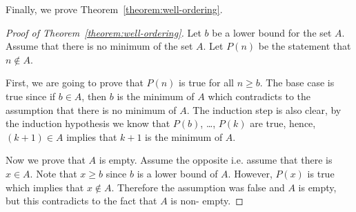 Finally, we prove Theorem~\ref{theorem:well-ordering}.
\begin{proof}[Proof of Theorem~\ref{theorem:well-ordering}]
  Let $b$ be a lower bound for the set $A$. Assume that there is no minimum of
  the set $A$. Let $P(n)$ be the statement that
  $n \notin A$.

  First, we are going to prove that $P(n)$ is true for all
  $n \ge b$. The base case is true since if $b \in A$, then $b$ is the minimum
  of $A$ which contradicts to the assumption that there is no minimum of $A$.
  The induction step is also clear, by the induction hypothesis we know that
  $P(b)$, \dots, $P(k)$ are true, hence, $(k + 1) \in A$ implies that $k + 1$
  is the minimum of $A$.

  Now we prove that $A$ is empty. Assume the opposite i.e. assume that there is
  $x \in A$. Note that $x \ge b$ since $b$ is a lower bound of $A$. However,
  $P(x)$ is true which implies that $x \notin A$. Therefore the assumption was
  false and $A$ is empty, but this contradicts to the fact that $A$ is non-
  empty.
\end{proof}

